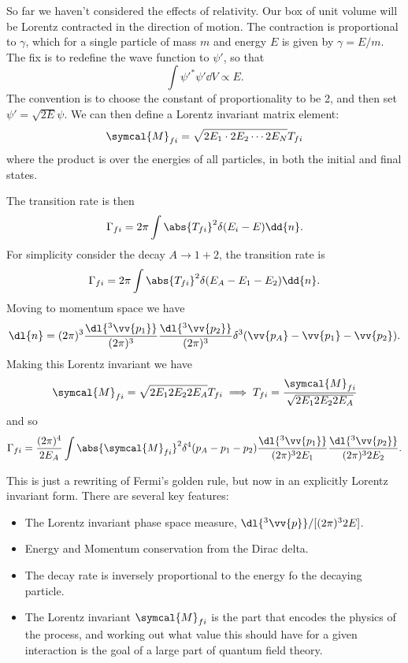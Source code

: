 \documentclass[fleqn]{NotesClass}
\newcommand{\amplitude}{\symcal{M}}
\begin{document}
    So far we haven't considered the effects of relativity.
    Our box of unit volume will be Lorentz contracted in the direction of motion.
    The contraction is proportional to \(\gamma\), which for a single particle of mass \(m\) and energy \(E\) is given by \(\gamma = E/m\).
    The fix is to redefine the wave function to \(\psi'\), so that
    \begin{equation}
        \int \psi'^*\psi' \dd{V} \propto E.
    \end{equation}
    The convention is to choose the constant of proportionality to be 2, and then set \(\psi' = \sqrt{2E}\psi\).
    We can then define a Lorentz invariant matrix element:
    \begin{equation}
        \amplitude_{fi} = \sqrt{2E_1 \cdot 2E_2 \dotsm 2E_N} T_{fi}
    \end{equation}
    where the product is over the energies of all particles, in both the initial and final states.
    
    The transition rate is then
    \begin{equation}
        \Gamma_{fi} = 2\pi \int \abs{T_{fi}}^2 \delta(E_i - E) \dd{n}.
    \end{equation}
    For simplicity consider the decay \(A \to 1 + 2\), the transition rate is
    \begin{equation}
        \Gamma_{fi} = 2\pi \int \abs{T_{fi}}^2 \delta(E_A - E_1 - E_2) \dd{n}.
    \end{equation}
    Moving to momentum space we have
    \begin{equation}
        \dl{n} = (2\pi)^3 \frac{\dl{^3\vv{p_1}}}{(2\pi)^3} \frac{\dl{^3\vv{p_2}}}{(2\pi)^3} \delta^3(\vv{p_A} - \vv{p_1} - \vv{p_2}).
    \end{equation}
    Making this Lorentz invariant we have
    \begin{equation}
        \amplitude_{fi} = \sqrt{2E_12E_22E_A} T_{fi} \implies T_{fi} = \frac{\amplitude_{fi}}{\sqrt{2E_12E_22E_A}}
    \end{equation}
    and so
    \begin{equation}
        \Gamma_{fi} = \frac{(2\pi)^4}{2E_A} \int \abs{\amplitude_{fi}}^2 \delta^4(p_A - p_1 - p_2) \frac{\dl{^3\vv{p_1}}}{(2\pi)^32E_1} \frac{\dl{^3\vv{p_2}}}{(2\pi)^32E_2}.
    \end{equation}
    
    This is just a rewriting of Fermi's golden rule, but now in an explicitly Lorentz invariant form.
    There are several key features:
    \begin{itemize}
        \item The Lorentz invariant phase space measure, \(\dl{^3\vv{p}}/[(2\pi)^32E]\).
        \item Energy and Momentum conservation from the Dirac delta.
        \item The decay rate is inversely proportional to the energy fo the decaying particle.
        \item The Lorentz invariant \(\amplitude_{fi}\) is the part that encodes the physics of the process, and working out what value this should have for a given interaction is the goal of a large part of quantum field theory.
    \end{itemize}
    
\end{document}
